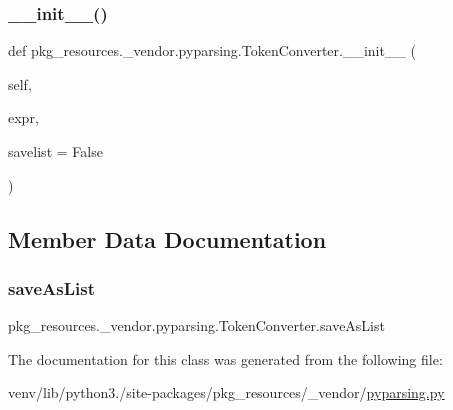 \subsubsection{\texorpdfstring{\+\_\+\+\_\+init\+\_\+\+\_\+()}{\_\_init\_\_()}}
{\footnotesize\ttfamily def pkg\+\_\+resources.\+\_\+vendor.\+pyparsing.\+Token\+Converter.\+\_\+\+\_\+init\+\_\+\+\_\+ (\begin{DoxyParamCaption}\item[{}]{self,  }\item[{}]{expr,  }\item[{}]{savelist = {\ttfamily False} }\end{DoxyParamCaption})}



\subsection{Member Data Documentation}
\mbox{\label{classpkg__resources_1_1__vendor_1_1pyparsing_1_1TokenConverter_aed35ce39b8a906800783a8b10c702363}} 
\subsubsection{\texorpdfstring{save\+As\+List}{saveAsList}}
{\footnotesize\ttfamily pkg\+\_\+resources.\+\_\+vendor.\+pyparsing.\+Token\+Converter.\+save\+As\+List}



The documentation for this class was generated from the following file\+:\begin{DoxyCompactItemize}
\item 
venv/lib/python3./site-\/packages/pkg\+\_\+resources/\+\_\+vendor/\hyperlink{pkg__resources_2__vendor_2pyparsing_8py}{pyparsing.\+py}\end{DoxyCompactItemize}
